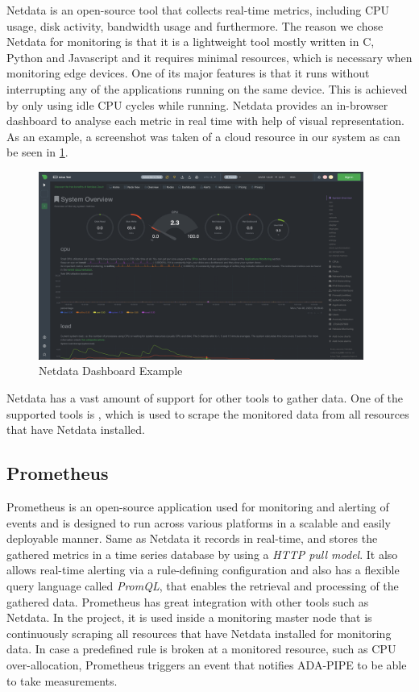     Netdata \cite{netdatainc.GettingStartedLearn2023} is an open-source tool that collects real-time metrics, including CPU usage, disk activity, bandwidth usage and furthermore.
    The reason we chose Netdata for monitoring is that it is a lightweight tool mostly written in C, Python and Javascript and it requires minimal resources, which is necessary when monitoring edge devices.
    One of its major features is that it runs without interrupting any of the applications running on the same device. This is achieved by only using idle CPU cycles while running.
    Netdata provides an in-browser dashboard to analyse each metric in real time with help of visual representation. As an example, a screenshot was taken of a cloud resource in our system as can be seen in \ref{fig:netdata-dashboard}.
    \begin{figure}[h!]
        \centering
        \includegraphics[width=0.95\textwidth]{figures/netdata.png}
        \caption{Netdata Dashboard Example}
        \label{fig:netdata-dashboard}
    \end{figure}
    Netdata has a vast amount of support for other tools to gather data. 
    One of the supported tools is , which is used to scrape the monitored data from all resources that have Netdata installed.

  \subsection{Prometheus}
  \label{sec:prometheus-third-party}
  
    Prometheus \cite{prometheusOverviewPrometheus} is an open-source application used for monitoring and alerting of events and is designed to run across various platforms in a scalable and easily deployable manner.
    Same as Netdata it records in real-time, and stores the gathered metrics in a time series database by using a \emph{HTTP pull model}. It also allows real-time alerting via a rule-defining configuration and also has a flexible query language called \emph{PromQL}, that enables the retrieval and processing of the gathered data. Prometheus has great integration with other tools such as Netdata.
    In the project, it is used inside a monitoring master node that is continuously scraping all resources that have Netdata installed for monitoring data. In case a predefined rule is broken at a monitored resource, such as CPU over-allocation, Prometheus triggers an event that notifies ADA-PIPE to be able to take measurements.



